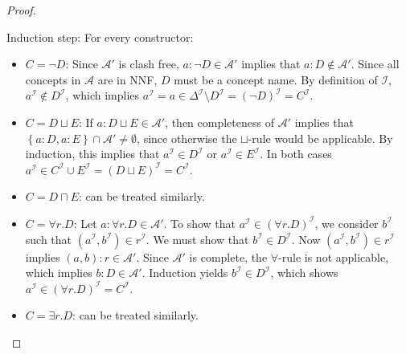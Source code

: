 \begin{proof}
\begin{itemize}
			Induction step: For every constructor:
			\begin{itemize}
				\item $C = \neg D$: Since $\mathcal{A}'$ is clash free, $a : \neg D \in \mathcal{A}'$ implies that $a : D \notin \mathcal{A}'$.
					Since all concepts in $\mathcal{A}$ are in NNF, $D$ must be a concept name.
					By definition of $\mathcal{I}$, $a^\mathcal{I} \notin D^\mathcal{I}$,
					which implies $a^\mathcal{I} = a \in \Delta^\mathcal{I} \setminus D^\mathcal{I} = (\neg D)^\mathcal{I} = C^\mathcal{I}$.
				\item $C = D \sqcup E$: If $a : D \sqcup E \in \mathcal{A}'$, then completeness of $\mathcal{A}'$ implies that
					$\left\{ a:D, a:E \right\} \cap \mathcal{A}' \neq \emptyset$, since otherwise the $\sqcup$-rule would be applicable.
					By induction, this implies that $a^\mathcal{I} \in D^\mathcal{I}$ or $a^\mathcal{I} \in E^\mathcal{I}$.
					In both cases $a^\mathcal{I} \in C^\mathcal{I} \cup E^\mathcal{I} = (D \sqcup E)^\mathcal{I} = C^\mathcal{I}$.
				\item $C = D \sqcap E$: can be treated similarly.
				\item $C = \forall r.D$: Let $a : \forall r.D \in \mathcal{A}'$.
					To show that $a^\mathcal{I} \in (\forall r.D)^\mathcal{I}$, we consider $b^\mathcal{I}$ such that $(a^\mathcal{I}, b^\mathcal{I}) \in r^\mathcal{I}$.
					We must show that $b^\mathcal{I} \in D^\mathcal{I}$.
					Now $(a^\mathcal{I}, b^\mathcal{I}) \in r^\mathcal{I}$ implies $(a,b) : r \in \mathcal{A}'$.
					Since $\mathcal{A}'$ is complete, the $\forall$-rule is not applicable, which implies $b : D \in \mathcal{A}'$.
					Induction yields $b^\mathcal{I} \in D^\mathcal{I}$, which shows $a^\mathcal{I} \in (\forall r.D)^\mathcal{I} = C^\mathcal{I}$.
				\item $C = \exists r.D$: can be treated similarly.
					\qedhere
			\end{itemize}
	\end{itemize}
\end{proof}
